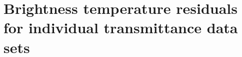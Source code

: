 \section{Brightness temperature residuals for individual transmittance data sets}
\label{app:dtb}




